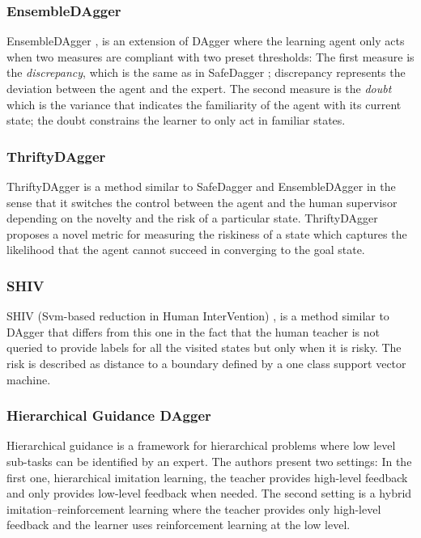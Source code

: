 \subsubsection*{EnsembleDAgger}
EnsembleDAgger \cite{EnsembleDAgger-Menda:2019}, is an extension of DAgger where the learning agent only acts when two measures are compliant with two preset thresholds: The first measure is the \textit{discrepancy}, which is the same as in SafeDagger \cite{SafeDAgger-Zhang-Cho:2016}; discrepancy represents the deviation between the agent and the expert. The second measure is the \textit{doubt} which is the variance that indicates the familiarity of the agent with its current state; the doubt constrains the learner to only act in familiar states. 

\subsubsection*{ThriftyDAgger}
ThriftyDAgger \cite{ThriftyDAgger} is a method similar to SafeDagger \cite{SafeDAgger-Zhang-Cho:2016} and EnsembleDAgger \cite{EnsembleDAgger-Menda:2019} in the sense that it switches the control between the agent and the human supervisor depending on the novelty and the risk of a particular state. ThriftyDAgger proposes a novel metric for measuring the riskiness of a state which captures the likelihood that the agent cannot succeed in converging to the goal state.

\subsubsection*{SHIV}
SHIV (Svm-based reduction in Human InterVention) \cite{SHIV-Laskey:2016},  is a method similar to DAgger \cite{DAgger-Ross:2011} that differs from this one in the fact that the human teacher is not queried to provide labels for all the visited states but only when it is risky. The risk is described as distance to a boundary defined by a one class support vector machine.

\subsubsection*{Hierarchical Guidance DAgger}
Hierarchical guidance \cite{Hierarchical-guidance-Le:2018} is a framework for hierarchical problems where low level sub-tasks can be identified by an expert. The authors present two settings: In the first one, hierarchical imitation learning,  the teacher provides high-level feedback and only provides low-level feedback when needed. The second setting is a hybrid imitation–reinforcement learning where the teacher provides only high-level feedback and the learner uses reinforcement learning at the low level.



